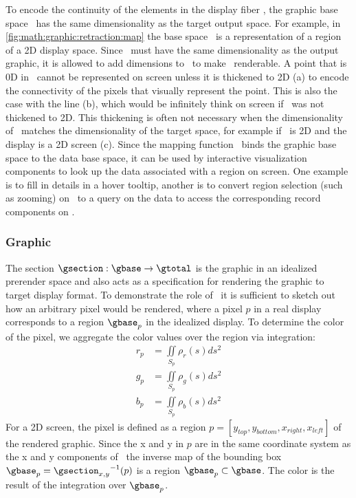 \documentclass[../main.tex]{subfiles}
\begin{document}
To encode the continuity of the elements in the display fiber \gfiber, the graphic base space \gbase\ has the same dimensionality as the target output space. For example, in \autoref{fig:math:graphic:retraction:map} the base space \gbase\ is a representation of a region of a 2D display space. Since \gbase\ must have the same dimensionality as the output graphic, it is allowed to add dimensions to \dbase\ to make \dbase\ renderable. A point that is 0D in \dbase\ cannot be represented on screen unless it is thickened to 2D (a) to encode the connectivity of the pixels that visually represent the point. This is also the case with the line (b), which would be infinitely think on screen if \gbase\ was not thickened to 2D. This thickening is often not necessary when the dimensionality of \dbase\ matches the dimensionality of the target space, for example if \dbase\ is 2D and the display is a 2D screen (c). Since the mapping function \vindex\ binds the graphic base space to the data base space, it can be used by interactive visualization components to look up the data associated with a region on screen.  One example is to fill in details in a hover tooltip, another is to convert region selection (such as zooming) on \gbase\ to a query on the data to access the corresponding record components on \dbase.

\subsubsection{Graphic \gsection}
\label{sec:math:graphic:section}
The section $\gsection: \gbase \rightarrow \gtotal$ is the graphic in an idealized prerender space and also acts as a specification for rendering the graphic to target display format. To demonstrate the role of \gsection\, it is sufficient to sketch out how an arbitrary pixel would be rendered, where a pixel $p$ in a real display corresponds to a region $\gbase_p$ in the idealized display. To determine the color of the pixel, we aggregate the color values over the region via integration:
\begin{align*}
    \label{eq:math:graphic:section:color}
    r_p &= \iint\limits_{S_p} \rho_r(s)ds^{2}\\
    g_p &= \iint\limits_{S_p} \rho_g(s)ds^{2}\\
    b_p &= \iint\limits_{S_p} \rho_b(s)ds^{2}
\end{align*}
For a 2D screen, the pixel is defined as a region $p=\left[y_{top}, y_{bottom}, x_{right}, x_{left}\right]$ of the rendered graphic. Since the x and y in $p$ are in the same coordinate system as the x and y components of \gfiber\,  the inverse map of the bounding box $\gbase_{p} ={\gsection_{x,y}}^{-1}(p)$ is a region $\gbase_p \subset \gbase$. The color is the result of the integration over  $\gbase_p$.
\end{document}
